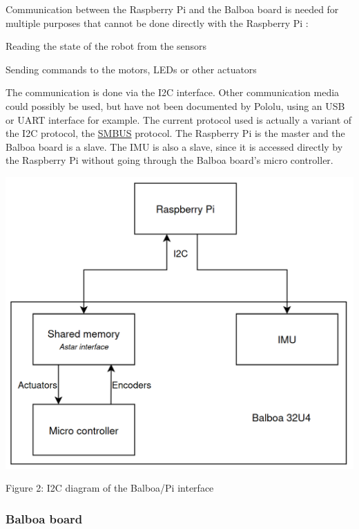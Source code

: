 \documentclass{article}
\begin{document}
Communication between the Raspberry Pi and the Balboa board is needed for multiple purposes
that cannot be done directly with the Raspberry Pi :

\begin{list}{-}{}
    \item Reading the state of the robot from the sensors
    \item Sending commands to the motors, LEDs or other actuators
\end{list}

The communication is done via the I2C interface.
Other communication media could possibly be used, but have not been documented by Pololu,
using an USB or UART interface for example.
The current protocol used is actually a variant of the I2C protocol, the
\href{https://en.wikipedia.org/wiki/System_Management_Bus}{SMBUS} protocol.
The Raspberry Pi is the master and the Balboa board is a slave.
The IMU is also a slave, since it is accessed directly by the Raspberry Pi without
going through the Balboa board's micro controller.

\begin{center}

    \includegraphics[scale=0.25]{img/i2c-interface-diagram.png}

    Figure 2: I2C diagram of the Balboa/Pi interface

\end{center}

\subsubsection{Balboa board}
\end{document}
